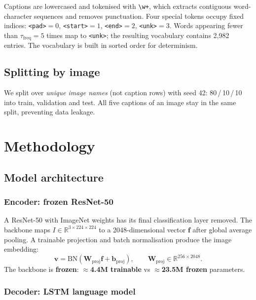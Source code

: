 \documentclass{article}
\begin{document}
Captions are lowercased and tokenised with \verb|\w+|, which extracts contiguous word-character sequences and removes punctuation. Four special tokens occupy fixed indices: \texttt{<pad>}$=0$, \texttt{<start>}$=1$, \texttt{<end>}$=2$, \texttt{<unk>}$=3$. Words appearing fewer than
$\tau_{\text{freq}} = 5$ times map to \texttt{<unk>}; the resulting vocabulary
contains 2{,}982 entries. The vocabulary is built in sorted order for
determinism.

\subsection{Splitting by image}

We split over \emph{unique image names} (not caption rows) with seed 42: 80\,/\,10\,/\,10 into train, validation and test. All five captions of an image stay in the same split, preventing data leakage.

\section{Methodology}

\subsection{Model architecture}

\subsubsection{Encoder: frozen ResNet-50}

A ResNet-50 with ImageNet weights has its final classification layer removed. The backbone maps $I \in \mathbb{R}^{3 \times 224 \times 224}$ to a 2048-dimensional vector $\mathbf{f}$ after global average pooling. A trainable projection and batch normalisation produce the image embedding:
\begin{equation}
  \mathbf{v} = \mathrm{BN}\!\left( \mathbf{W}_{\text{proj}} \mathbf{f} +
  \mathbf{b}_{\text{proj}} \right), \qquad
  \mathbf{W}_{\text{proj}} \in \mathbb{R}^{256 \times 2048}.
\end{equation}
The backbone is \textbf{frozen}: $\approx$\textbf{4.4M trainable} vs $\approx$\textbf{23.5M frozen} parameters.

\subsubsection{Decoder: LSTM language model}
\end{document}
